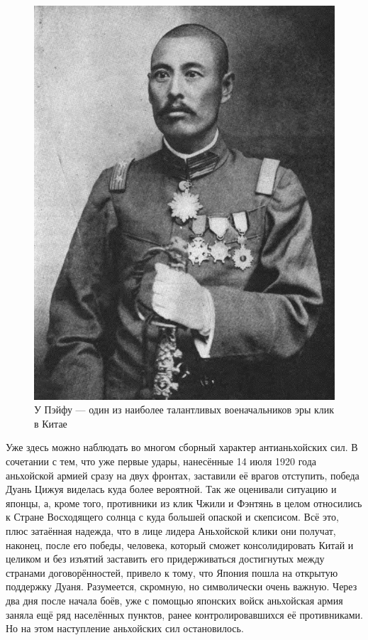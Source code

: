 \begin{figure}[h!tb] 
	\centering\includegraphics[scale=0.4]{Glava6/Iu72jXZsrns.jpg}
	\caption{У Пэйфу — один из наиболее талантливых военачальников эры клик в Китае}%
\end{figure}

Уже здесь можно наблюдать во многом сборный характер антианьхойских сил. В сочетании с тем, что уже первые удары, нанесённые 14 июля 1920 года аньхойской армией сразу на двух фронтах, заставили её врагов отступить, победа Дуань Цижуя виделась куда более вероятной. Так же оценивали ситуацию и японцы, а, кроме того, противники из клик Чжили и Фэнтянь в целом относились к Стране Восходящего солнца с куда большей опаской и скепсисом. Всё это, плюс затаённая надежда, что в лице лидера Аньхойской клики они получат, наконец, после его победы, человека, который сможет консолидировать Китай и целиком и без изъятий заставить его придерживаться достигнутых между странами договорённостей, привело к тому, что Япония пошла на открытую поддержку Дуаня. Разумеется, скромную, но символически очень важную. Через два дня после начала боёв, уже с помощью японских войск аньхойская армия заняла ещё ряд населённых пунктов, ранее контролировавшихся её противниками. Но на этом наступление аньхойских сил остановилось.

